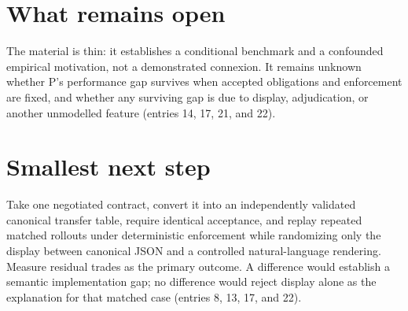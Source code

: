 \documentclass{article}
\begin{document}
\section*{What remains open}
The material is thin: it establishes a conditional benchmark and a confounded empirical motivation, not a demonstrated connexion. It remains unknown whether P's performance gap survives when accepted obligations and enforcement are fixed, and whether any surviving gap is due to display, adjudication, or another unmodelled feature (entries 14, 17, 21, and 22).

\section*{Smallest next step}
Take one negotiated contract, convert it into an independently validated canonical transfer table, require identical acceptance, and replay repeated matched rollouts under deterministic enforcement while randomizing only the display between canonical JSON and a controlled natural-language rendering. Measure residual trades as the primary outcome. A difference would establish a semantic implementation gap; no difference would reject display alone as the explanation for that matched case (entries 8, 13, 17, and 22).
\end{document}
